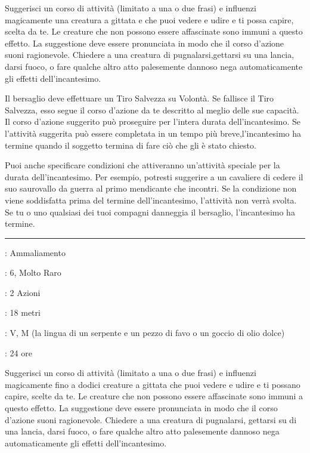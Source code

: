 \begin{multicols}{2}
Suggerisci un corso di attività (limitato a una o due frasi) e influenzi magicamente una creatura a gittata e che puoi vedere e udire e ti possa capire, scelta da te. Le creature che non possono essere affascinate sono immuni a questo effetto. La suggestione deve essere pronunciata in modo che il corso d'azione suoni ragionevole. Chiedere a una creatura di pugnalarsi,gettarsi su una lancia, darsi fuoco, o fare qualche altro atto palesemente dannoso nega automaticamente gli effetti dell'incantesimo.

Il bersaglio deve effettuare un Tiro Salvezza su Volontà. Se fallisce il Tiro Salvezza, esso segue il corso d'azione da te descritto al meglio delle sue capacità. Il corso d'azione suggerito può proseguire per l'intera durata dell'incantesimo. Se l'attività suggerita può essere completata in un tempo più breve,l'incantesimo ha termine quando il soggetto termina di fare ciò che gli è stato chiesto.

Puoi anche specificare condizioni che attiveranno un'attività speciale per la durata dell'incantesimo. Per esempio, potresti suggerire a un cavaliere di cedere il suo saurovallo da guerra al primo mendicante che incontri. Se la condizione non viene soddisfatta prima del termine dell'incantesimo, l'attività non verrà svolta. Se tu o uno qualsiasi dei tuoi compagni danneggia il bersaglio, l'incantesimo ha termine.

\smallskip\noindent\rule{\linewidth}{2pt} \hypertarget{Suggestione di Massa}{}\medskip{}
\noindent
\begin{description}[noitemsep, topsep=0pt, parsep=0pt, partopsep=0pt, leftmargin=0cm, labelwidth=2.8cm]
	\item[\textbf{Lista di Magia}]: Ammaliamento
	\item[\textbf{Livello}]: 6, Molto Raro
	\item[\textbf{T. di Lancio}]: 2 Azioni
	\item[\textbf{Gittata}]: 18 metri
	\item[\textbf{Componenti}]: V, M (la lingua di un serpente e un pezzo di favo o un goccio di olio dolce)
	\item[\textbf{Durata}]: 24 ore
\end{description}

Suggerisci un corso di attività (limitato a una o due frasi) e influenzi magicamente fino a dodici creature a gittata che puoi vedere e udire e ti possano capire, scelte da te. Le creature che non possono essere affascinate sono immuni a questo effetto. La suggestione deve essere pronunciata in modo che il corso d'azione suoni ragionevole. Chiedere a una creatura di pugnalarsi, gettarsi su di una lancia, darsi fuoco, o fare qualche altro atto palesemente dannoso nega automaticamente gli effetti dell'incantesimo.


\end{multicols}
